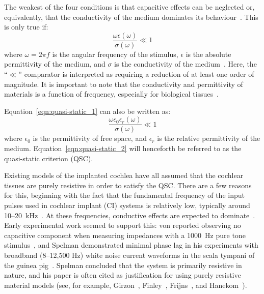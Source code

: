 The weakest of the four conditions is that capacitive effects can be neglected
or, equivalently, that the conductivity of the medium dominates its
behaviour~\cite{plonsey1967}. This is only true if:
\begin{equation}
	\frac{\omega \epsilon(\omega)}{\sigma(\omega)} \ll 1
	\label{eqn:quasi-static_1}
\end{equation}
where $ \omega = 2 \pi f $ is the angular frequency of the stimulus, $ \epsilon
$ is the absolute permittivity of the medium, and $ \sigma $ is the conductivity
of the medium~\cite{plonsey1967}. Here, the ``$ \ll $'' comparator is
interpreted as requiring a reduction of at least one order of magnitude. It is
important to note that the conductivity and permittivity of materials is a
function of frequency, especially for biological
tissues~\cite{schwan1957capacitive,schwan1957conductivity,gabriel1996b}.

Equation~\ref{eqn:quasi-static_1} can also be written as:
\begin{equation}
	\frac{\omega \epsilon_0 \epsilon_r(\omega)}{\sigma(\omega)} \ll 1
	\label{eqn:quasi-static_2}
\end{equation}
where $ \epsilon_0 $ is the permittivity of free space, and $ \epsilon_r $ is
the relative permittivity of the medium. Equation~\ref{eqn:quasi-static_2} will
henceforth be referred to as the quasi-static criterion (QSC).

Existing models of the implanted cochlea have all assumed that the cochlear
tissues are purely resistive in order to satisfy the QSC. There are a few
reasons for this, beginning with the fact that the fundamental frequency of the
input pulses used in cochlear implant (CI) systems is relatively low, typically
around 10--20~kHz~\cite{vanpoucke2004identification}. At these frequencies,
conductive effects are expected to dominate~\cite{grimnes2000}. Early
experimental work seemed to support this: von \bekesy{} reported observing no
capacitive component when measuring impedances with a 1000~Hz pure tone
stimulus~\cite{vonbekesy1951}, and Spelman demonstrated minimal phase lag in his
experiments with broadband (8--12,500 Hz) white noise current waveforms in the
scala tympani of the guinea pig~\cite{spelman1982}. Spelman concluded that the
system is primarily resistive in nature, and his paper is often cited as
justification for using purely resistive material models (see, for example,
Girzon~\cite{girzon1987}, Finley~\cite{finley1990}, Frijns~\cite{frijns1995},
and Hanekom~\cite{hanekom2001}).

